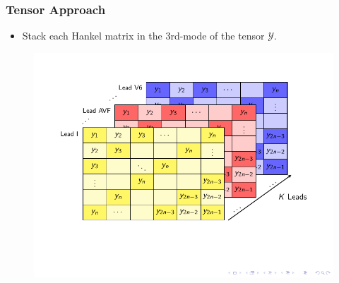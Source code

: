 \documentclass{beamer}
\begin{document}
	\begin{frame}
		\frametitle{Tensor Approach}
		
		\vspace{-3.5cm}
		\begin{itemize}
			\item Stack each Hankel matrix in the 3rd-mode of the tensor $\mathcal{Y}$.
		\end{itemize}
		
		\vspace{3.0cm}
		\begin{figure}[!ht]
			\centering
			\vspace{-3.5cm}
			\includegraphics[scale=1.0,trim={1.0cm 8.5cm 1.0cm 7.3cm},clip=true]{tikz_tensorHankel.pdf}
		\end{figure}
	\end{frame}
\end{document}
